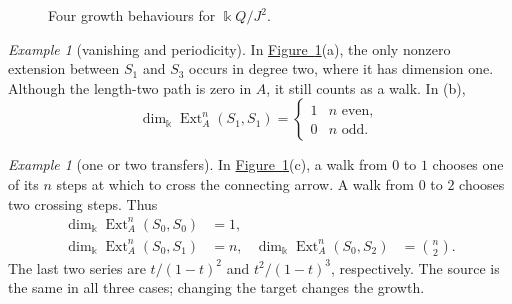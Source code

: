 \documentclass[reqno]{amsart}
\numberwithin{equation}{section}
\theoremstyle{definition}
\theoremstyle{remark}
\newtheorem{example}[theorem]{Example}
\DeclareMathOperator{\Ext}{Ext}
\newcommand{\kk}{\Bbbk}
\newcommand{\kdim}{\dim_{\kk}}
\newcommand{\figref}[1]{\hyperref[#1]{Figure~\ref*{#1}}}
\begin{document}
\begin{figure}[ht]
\centering
{}
\caption{Four growth behaviours for \(\kk Q/J^2\).}
\label{fig:small}
\end{figure}

\begin{example}[vanishing and periodicity]
In \figref{fig:small}(a), the only nonzero extension between \(S_1\) and \(S_3\) occurs in degree two, where it has dimension one. Although the length-two path is zero in \(A\), it still counts as a walk. In (b),
\[
  \kdim\Ext_A^n(S_1,S_1)=\begin{cases}1& n\text{ even},\\0&n\text{ odd}.\end{cases}
\]
\end{example}

\begin{example}[one or two transfers]\label{ex:polynomial}
In \figref{fig:small}(c), a walk from \(0\) to \(1\) chooses one of its \(n\) steps at which to cross the connecting arrow. A walk from \(0\) to \(2\) chooses two crossing steps. Thus
\[
 \begin{aligned}
 \kdim\Ext_A^n(S_0,S_0)&=1,\\
 \kdim\Ext_A^n(S_0,S_1)&=n,&
 \kdim\Ext_A^n(S_0,S_2)&=\binom n2.
 \end{aligned}
\]
The last two series are \(t/(1-t)^2\) and \(t^2/(1-t)^3\), respectively. The source is the same in all three cases; changing the target changes the growth.
\end{example}
\end{document}
